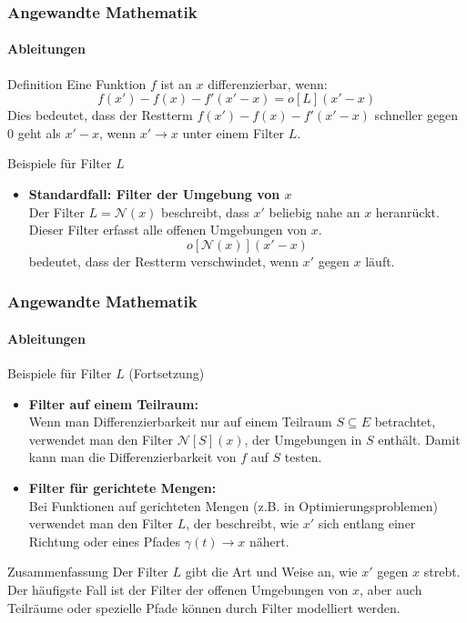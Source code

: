 \documentclass{beamer}
\begin{document}
\begin{frame}
    \frametitle{Angewandte Mathematik}
    \framesubtitle{Ableitungen}

\begin{block}{Definition}
  Eine Funktion \( f \) ist an \( x \) differenzierbar, wenn:
  \[
  f(x') - f(x) - f'(x' - x) = o[L](x' - x)
  \]
  Dies bedeutet, dass der Restterm \( f(x') - f(x) - f'(x' - x) \) schneller gegen 0 geht als \( x' - x \), wenn \( x' \to x \) unter einem Filter \( L \).
\end{block}

\begin{block}{Beispiele für Filter \( L \)}
  \begin{itemize}
    \item \textbf{Standardfall: Filter der Umgebung von \( x \)} \\
    Der Filter \( L = \mathcal{N}(x) \) beschreibt, dass \( x' \) beliebig nahe an \( x \) heranrückt. Dieser Filter erfasst alle offenen Umgebungen von \( x \). 
    \[
    o[{\mathcal{N}(x)}](x' - x)
    \]
    bedeutet, dass der Restterm verschwindet, wenn \( x' \) gegen \( x \) läuft.
  \end{itemize}
\end{block}
\end{frame}

\begin{frame}
    \frametitle{Angewandte Mathematik}
    \framesubtitle{Ableitungen}

\begin{block}{Beispiele für Filter \( L \) (Fortsetzung)}
  \begin{itemize}
      
    \item \textbf{Filter auf einem Teilraum:} \\
    Wenn man Differenzierbarkeit nur auf einem Teilraum \( S \subseteq E \) betrachtet, 
    verwendet man den Filter \( \mathcal{N}[S](x) \), der Umgebungen in \( S \) enthält. Damit kann man die Differenzierbarkeit von \( f \) auf \( S \) testen.
  
    \item \textbf{Filter für gerichtete Mengen:} \\
    Bei Funktionen auf gerichteten Mengen (z.B. in Optimierungsproblemen) verwendet man den Filter \( L \), der beschreibt, wie \( x' \) sich entlang einer Richtung oder eines Pfades \( \gamma(t) \to x \) nähert.
  \end{itemize}
\end{block}

\vspace{-0.5cm} %

\begin{block}{Zusammenfassung}
  Der Filter \( L \) gibt die Art und Weise an, wie \( x' \) gegen \( x \) strebt. Der häufigste Fall ist der Filter der offenen Umgebungen von \( x \), aber auch Teilräume oder spezielle Pfade können durch Filter modelliert werden.
\end{block}

\end{frame}
\end{document}
